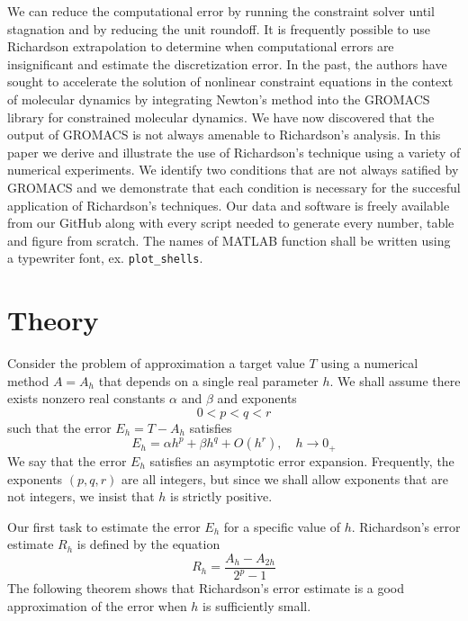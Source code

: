 \documentclass[runningheads]{llncs}
\begin{document}
We can reduce the computational error by running the constraint solver until stagnation and by reducing the unit roundoff.
It is frequently possible to use Richardson extrapolation to determine when computational errors are insignificant and estimate the discretization error.
In the past, the authors have sought to accelerate the solution of nonlinear constraint equations in the context of molecular dynamics by integrating Newton's method into the GROMACS library for constrained molecular dynamics.
We have now discovered that the output of GROMACS is not always amenable to Richardson's analysis.
In this paper we derive and illustrate the use of Richardson's technique using a variety of numerical experiments.
We identify two conditions that are not always satified by GROMACS and we demonstrate that each condition is necessary for the succesful application of Richardson's techniques.
Our data and software is freely available from our GitHub along with every script needed to generate every number, table and figure from scratch. The names of MATLAB function shall be written using a typewriter font, ex. {\tt plot\_shells}. 


\section{Theory}

Consider the problem of approximation a target value $T$ using a numerical method $A = A_h$ that depends on a single real parameter $h$. We shall assume there exists nonzero real constants $\alpha$ and $\beta$ and exponents
\begin{equation}
  0 < p < q < r
\end{equation}
such that the error $E_h = T - A_h$ satisfies
\begin{equation} \label{equ:aex}
  E_h  = \alpha h^p + \beta h^q + O(h^r), \quad h \rightarrow 0_+
\end{equation}
We say that the error $E_h$ satisfies an asymptotic error expansion. Frequently, the exponents $(p,q,r)$ are all integers, but since we shall allow exponents that are not integers, we insist that $h$ is strictly positive.

Our first task to estimate the error $E_h$ for a specific value of $h$. Richardson's error estimate $R_h$ is defined by the equation
\begin{equation}
 R_h =  \frac{A_h - A_{2h}}{2^p - 1}
\end{equation}
The following theorem shows that Richardson's error estimate is a good approximation of the error when $h$ is sufficiently small.
\end{document}
